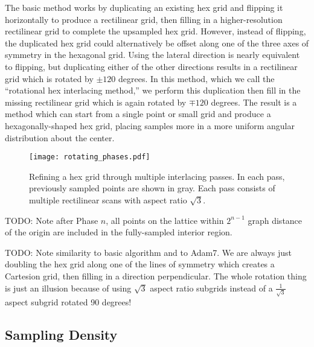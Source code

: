 \documentclass{article}
\begin{document}
The basic method works by duplicating an existing hex grid and flipping it horizontally to produce a rectilinear grid, then filling in a higher-resolution rectilinear grid to complete the upsampled hex grid.
%
However, instead of flipping, the duplicated hex grid could alternatively be offset along one of the three axes of symmetry in the hexagonal grid.
%
Using the lateral direction is nearly equivalent to flipping, but duplicating either of the other directions results in a rectilinear grid which is rotated by $\pm 120$ degrees.
%
In this method, which we call the ``rotational hex interlacing method,'' we perform this duplication then fill in the missing rectilinear grid which is again rotated by $\mp 120$ degrees.
%
The result is a method which can start from a single point or small grid and produce a hexagonally-shaped hex grid, placing samples more in a more uniform angular distribution about the center.



\begin{figure}[ht]
\centering
\texttt{[image: rotating\_phases.pdf]}
\caption{
\label{fig:rotatingphases} Refining a hex grid through multiple interlacing passes.
%
In each pass, previously sampled points are shown in gray.
%
Each pass consists of multiple rectilinear scans with aspect ratio $\sqrt{3}$.
}
\end{figure}


TODO: Note after Phase $n$, all points on the lattice within $2^{n-1}$ graph distance of the origin are included in the fully-sampled interior region.

TODO: Note similarity to basic algorithm and to Adam7. We are always just doubling the hex grid along one of the lines of symmetry which creates a Cartesion grid, then filling in a direction perpendicular. The whole rotation thing is just an illusion because of using $\sqrt{3}$ aspect ratio subgrids instead of a $\frac{1}{\sqrt{3}}$ aspect subgrid rotated 90 degrees!

\subsection{Sampling Density}
\label{sec:density}
\end{document}
